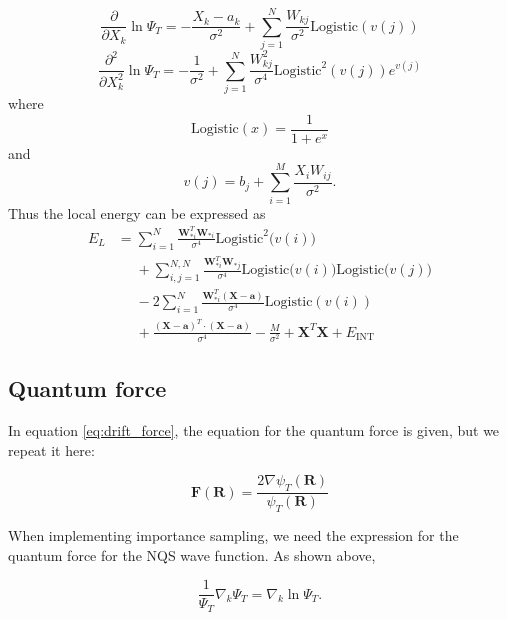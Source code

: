 \documentclass[norsk,a4paper,12pt]{article}
\begin{document}
\begin{equation}
\frac{\partial}{\partial X_k}\ln\Psi_T=-\frac{X_k-a_k}{\sigma^2}+\sum_{j=1}^{N}\frac{W_{kj}}{\sigma^2}\text{Logistic}(v(j))
\end{equation}
\begin{equation}
\frac{\partial^2}{\partial X_k^2}\ln\Psi_T=-\frac{1}{\sigma^2}+\sum_{j=1}^{N}\frac{W_{kj}^2}{\sigma^4}\text{Logistic}^2(v(j))e^{v(j)}
\end{equation}
where 
\begin{equation}
\text{Logistic}(x)=\frac{1}{1+e^x}
\end{equation}
and
\begin{equation}
v(j)=b_j+\sum_{i=1}^{M}\frac{X_iW_{ij}}{\sigma^2}.
\end{equation}
Thus the local energy can be expressed as
\begin{align}
E_L&=\sum_{i=1}^{N}\frac{\boldsymbol{W}_{*i}^T\boldsymbol{W}_{*i}}{\sigma^4}\text{Logistic}^2\big(v(i)\big)\\
&\phantom{=}+\sum_{i,j=1}^{N,N}\frac{\boldsymbol{W}_{*i}^T\boldsymbol{W}_{*j}}{\sigma^4}\text{Logistic}\big(v(i)\big)\text{Logistic}\big(v(j)\big)\\
&\phantom{=}-2\sum_{i=1}^N\frac{\boldsymbol{W}_{*i}^T(\boldsymbol{X}-\boldsymbol{a})}{\sigma^4}\text{Logistic}(v(i))\\
&\phantom{=}+\frac{(\boldsymbol{X}-\boldsymbol{a})^T\cdot(\boldsymbol{X}-\boldsymbol{a})}{\sigma^4}-\frac{M}{\sigma^2}+\boldsymbol{X}^T\boldsymbol{X}+E_{\text{INT}}
\end{align}

\subsection{Quantum force}
In equation \ref{eq:drift_force}, the equation for the quantum force is given, but we repeat it here:

\begin{equation*}
\label{eq:drift_force}
\boldsymbol{F}(\boldsymbol{R}) = \frac{2 \nabla \psi_T(\boldsymbol{R})}{\psi_T(\boldsymbol{R})}
\end{equation*}

 When implementing importance sampling, we need the expression for the quantum force for the NQS wave function. As shown above, 
 
\begin{equation}
\frac{1}{\Psi_T}\nabla_k\Psi_T=\nabla_k\ln\Psi_T.
\end{equation}
\end{document}
